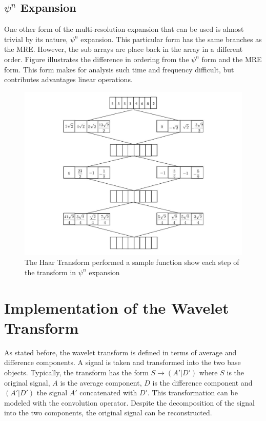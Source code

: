 \subsection {$\psi^n$ Expansion}
One other form of the multi-resolution expansion that can be used is almost trivial by its nature, $\psi^n$ expansion.  This particular form has the same branches as the MRE.  However, the sub arrays are place back in the array in a different order.    Figure illustrates the difference in ordering from the $\psi^n$ form and the MRE form.    This form makes for analysis such time and frequency difficult, but contributes advantages linear operations.
\begin{figure}
\includegraphics [width=7in]{psinexpansion.jpg}
\caption{The Haar Transform performed a sample function show each step of the transform in $\psi^n$ expansion }
\label{numpsin}
\end{figure}

\section{Implementation of the Wavelet Transform} \label{sec:implementation}

As stated before, the wavelet transform is defined in terms of average
and difference components. A signal is taken and transformed into the
two base objects.  Typically, the transform has the form $S\rightarrow
(A'|D')$ where $S$ is the original signal, $A$ is the average component,
$D$ is the difference component and $(A'|D')$ the signal $A'$
concatenated with $D'$.  This transformation can be modeled with the
convolution operator. Despite the decomposition of the signal into the
two components, the original signal can be reconstructed.

